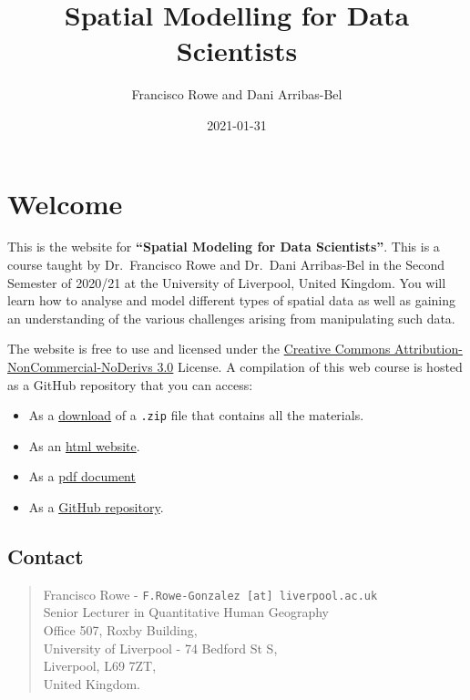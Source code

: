 \documentclass[
]{book}
\title{Spatial Modelling for Data Scientists}
\author{Francisco Rowe and Dani Arribas-Bel}
\date{2021-01-31}
\providecommand{\tightlist}{%
  \setlength{\itemsep}{0pt}\setlength{\parskip}{0pt}}
\begin{document}
\maketitle

{
\setcounter{tocdepth}{1}
\tableofcontents
}
\hypertarget{welcome}{%
\chapter*{Welcome}\label{welcome}}

This is the website for \textbf{``Spatial Modeling for Data Scientists''}. This is a course taught by Dr.~Francisco Rowe and Dr.~Dani Arribas-Bel in the Second Semester of 2020/21 at the University of Liverpool, United Kingdom. You will learn how to analyse and model different types of spatial data as well as gaining an understanding of the various challenges arising from manipulating such data.

The website is free to use and licensed under the \href{http://creativecommons.org/licenses/by-nc-nd/3.0/us/}{Creative Commons Attribution-NonCommercial-NoDerivs 3.0} License. A compilation of this web course is hosted as a GitHub repository that you can access:

\begin{itemize}
\tightlist
\item
  As a \href{https://github.com/GDSL-UL/san/archive/master.zip}{download} of a \texttt{.zip} file that contains all the materials.
\item
  As an \href{https://gdsl-ul.github.io/san/}{html website}.
\item
  As a \href{https://gdsl-ul.github.io/san/spatial_analysis_notes.pdf}{pdf document}
\item
  As a \href{https://github.com/GDSL-UL/san}{GitHub repository}.
\end{itemize}

\hypertarget{contact}{%
\section*{Contact}\label{contact}}

\begin{quote}
Francisco Rowe - \texttt{F.Rowe-Gonzalez\ {[}at{]}\ liverpool.ac.uk}\\
Senior Lecturer in Quantitative Human Geography\\
Office 507, Roxby Building,\\
University of Liverpool - 74 Bedford St S,\\
Liverpool, L69 7ZT,\\
United Kingdom.
\end{quote}
\end{document}
